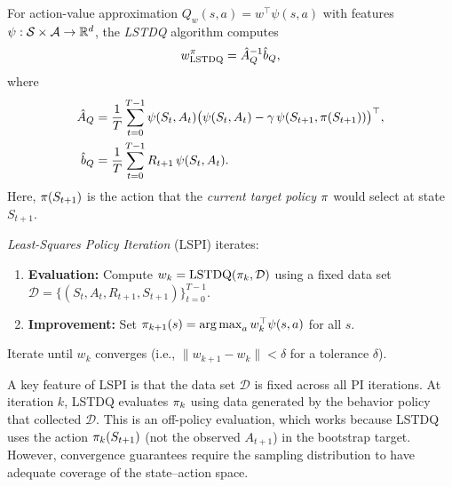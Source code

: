 \documentclass[11pt,a4paper]{article}
\begin{document}
\begin{definition}
\label{def:lstdq}
For action-value approximation $Q_w(s,a) = w^\top \psi(s,a)$ with
features $\psi : \mathcal{S} \times \mathcal{A} \to \mathbb{R}^d$, the
\emph{LSTDQ} algorithm computes
\begin{equation}
  w_{\mathrm{LSTDQ}}^{\pi} = \hat{A}_Q^{-1}\hat{b}_Q,
  \label{eq:lstdq}
\end{equation}
where
\begin{align}
  \hat{A}_Q &= \frac{1}{T}\sum_{t=0}^{T-1}
  \psi(S_t, A_t)\bigl(\psi(S_t, A_t)
  - \gamma\,\psi(S_{t+1}, \pi(S_{t+1}))\bigr)^\top,
  \label{eq:A_Q_hat}\\
  \hat{b}_Q &= \frac{1}{T}\sum_{t=0}^{T-1}
  R_{t+1}\,\psi(S_t, A_t).
  \label{eq:b_Q_hat}
\end{align}
Here, $\pi(S_{t+1})$ is the action that the \emph{current target
policy} $\pi$ would select at state $S_{t+1}$.
\end{definition}

\begin{definition}
\label{def:lspi}
\emph{Least-Squares Policy Iteration} (LSPI) iterates:
\begin{enumerate}
  \item \textbf{Evaluation:} Compute
    $w_k = \mathrm{LSTDQ}(\pi_k, \mathcal{D})$ using a fixed
    data set $\mathcal{D} = \{(S_t, A_t, R_{t+1}, S_{t+1})\}_{t=0}^{T-1}$.
  \item \textbf{Improvement:} Set
    $\pi_{k+1}(s) = \operatorname{arg\,max}_{a} w_k^\top \psi(s,a)$ for all $s$.
\end{enumerate}
Iterate until $w_k$ converges (i.e., $\|w_{k+1} - w_k\| < \delta$
for a tolerance $\delta$).
\end{definition}

\begin{remark}
\label{rem:lspi_offpolicy}
A key feature of LSPI is that the data set $\mathcal{D}$ is fixed
across all PI iterations. At iteration $k$, LSTDQ evaluates
$\pi_k$ using data generated by the behavior policy that
collected $\mathcal{D}$. This is an off-policy evaluation, which
works because LSTDQ uses the action $\pi_k(S_{t+1})$ (not the
observed $A_{t+1}$) in the bootstrap target. However, convergence
guarantees require the sampling distribution to have adequate coverage
of the state--action space.
\end{remark}
\end{document}
